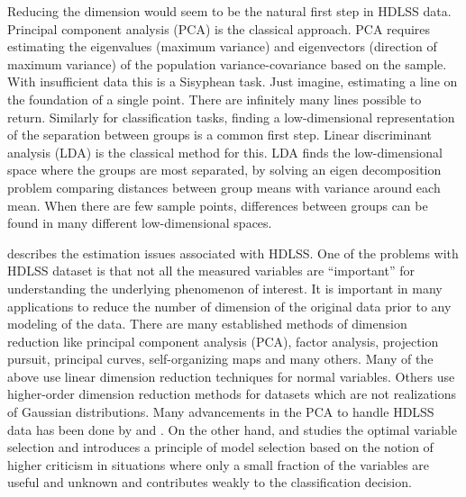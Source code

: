 
Reducing the dimension would seem to be the natural first step in HDLSS data. Principal component analysis (PCA) is the classical approach. PCA requires estimating the eigenvalues (maximum variance) and eigenvectors (direction of maximum variance) of the population variance-covariance based on the sample. With insufficient data this is a Sisyphean task. Just imagine, estimating a line on the foundation of a single point. There are infinitely many lines possible to return. Similarly for classification tasks, finding a low-dimensional representation of the separation between groups is a common first step. Linear discriminant analysis (LDA) is the classical method for this. LDA finds the low-dimensional space where the groups are most separated, by solving an eigen decomposition problem comparing distances between group means with variance around each mean. When there are few sample points, differences between groups can be found in many different low-dimensional spaces. 




\cite{marron:2007} describes the estimation issues associated with HDLSS.  
One of the problems with HDLSS dataset is that not all the measured variables are ``important'' for understanding the underlying phenomenon of interest. It is important in many applications to reduce the number of dimension of the original data prior to any modeling of the data. There are many established methods of dimension reduction like principal component analysis (PCA), factor analysis, projection pursuit, principal curves, self-organizing maps and many others. Many of the above use linear dimension reduction techniques for normal variables. Others use higher-order dimension reduction methods for datasets which are not realizations of Gaussian distributions.  Many advancements in the PCA to handle HDLSS data has been done by \cite{marron:2011} and \cite{yata:2010}. On the other hand, \cite{donoho:2009} and \cite{donoho:2008} studies the optimal variable selection and introduces a principle of model selection based on the notion of higher criticism in situations where only a small fraction of the variables are useful and unknown and contributes weakly to the classification decision.\\

